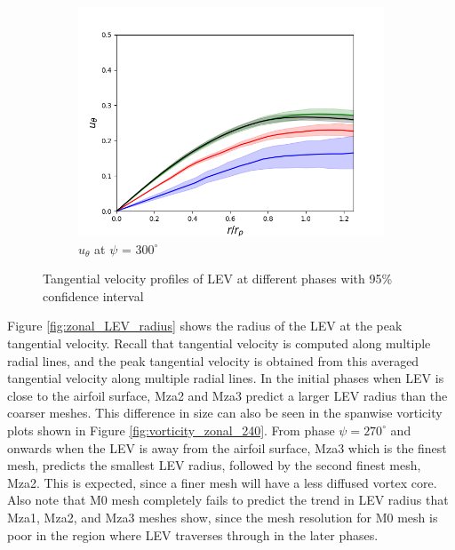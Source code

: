 \begin{figure}[H]
\begin{subfigure}[b]{0.475\textwidth}
	\centering
	\includegraphics[width=1\textwidth]{figures/zonal_adapt_results/LEV/u_theta/phase_300.png}
	\caption{ $u_\theta$ at $\psi$ = $300^\circ$}
	\label{fig:zonal_utheta_300}
	\end{subfigure}
    \label{fig:zonal_utheta_plots_LEV}
   	\caption{ Tangential velocity profiles of LEV at different phases with 95\% confidence interval}
\end{figure}


Figure \ref{fig:zonal_LEV_radius} shows the radius of the LEV at the peak tangential velocity. 
Recall that tangential velocity is computed along multiple radial lines, and the peak tangential velocity is obtained from this averaged tangential velocity along multiple radial lines. 
In the initial phases when LEV is close to the airfoil surface, Mza2 and Mza3 predict a larger LEV radius than the coarser meshes. 
This difference in size can also be seen in the spanwise vorticity plots shown in Figure \ref{fig:vorticity_zonal_240}.
From phase $\psi = 270^\circ$ and onwards when the LEV is away from the airfoil surface, Mza3 which is the finest mesh, predicts the smallest LEV radius, followed by the second finest mesh, Mza2. 
This is expected, since a finer mesh will have a less diffused vortex core. Also note that M0 mesh completely fails to predict the trend in LEV radius that Mza1, Mza2, and Mza3 meshes show, since the mesh resolution for M0 mesh is poor in the region where LEV traverses through in the later phases.


